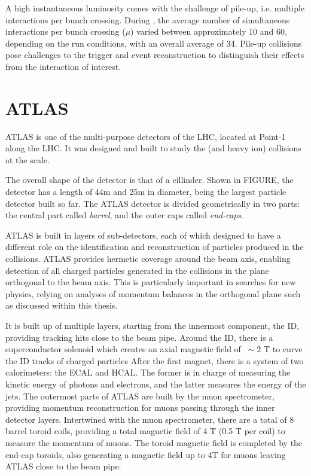 A high instantaneous luminosity comes with the challenge of pile-up, i.e. multiple \pp interactions per bunch crossing. During \RunTwo, the average number of simultaneous interactions per bunch crossing (\(\mu\)) varied between approximately 10 and 60, depending on the run conditions, with an overall average of 34. Pile-up collisions pose challenges to the trigger and event reconstruction to distinguish their effects from the interaction of interest.








\FloatBarrier
\section{ATLAS}
\label{sec:atlas:atlas}

\ac{ATLAS} is one of the multi-purpose detectors of the \ac{LHC}, located at Point-1 along the \ac{LHC}. It was designed and built to study the \pp (and heavy ion) collisions at the \tev scale.

The overall shape of the detector is that of a cillinder. Shown in FIGURE, the detector has a length of 44m and 25m in diameter, being the largest particle detector built so far. The \ac{ATLAS} detector is divided geometrically in two parts: the central part called \textit{barrel}, and the outer caps called \textit{end-caps}.

\ac{ATLAS} is built in layers of sub-detectors, each of which designed to have a different role on the identification and reconstruction of particles produced in the collisions. \ac{ATLAS} provides hermetic coverage around the beam axis, enabling detection of all charged particles generated in the collisions in the plane orthogonal to the beam axis. This is particularly important in searches for new physics, relying on analyses of momentum balances in the orthogonal plane such as discussed within this thesis.

It is built up of multiple layers, starting from the innermost component, the \acf{ID}, providing tracking hits close to the beam pipe. Around the \ac{ID}, there is a superconductor solenoid which creates an axial magnetic field of \(~\sim 2\) T to curve the \ac{ID} tracks of charged particles
After the first magnet, there is a system of two calorimeters: the \ac{ECAL} and \ac{HCAL}. The former is in charge of measuring the kinetic energy of photons and electrons, and the latter measures the energy of the jets.
The outermost parts of \ac{ATLAS} are built by the muon spectrometer, providing momentum reconstruction for muons passing through the inner detector layers. Intertwined with the muon spectrometer, there are a total of 8 barrel toroid coils, providing a total magnetic field of 4 T (0.5 T per coil) to measure the momentum of muons. The toroid magnetic field is completed by the end-cap toroids,  also generating a magnetic field up to 4T for muons leaving \ac{ATLAS} close to the beam pipe.

